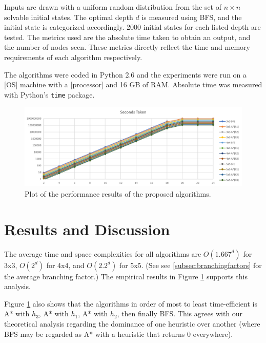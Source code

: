 \documentclass[runningheads]{llncs}
\begin{document}
Inputs are drawn with a uniform random distribution from the set of $n \times n$ solvable initial states. The optimal depth $d$ is measured using BFS, and the initial state is categorized accordingly. 2000 initial states for each listed depth are tested.
The metrics used are the absolute time taken to obtain an output, and the number of nodes seen. These metrics directly reflect the time and memory requirements of each algorithm respectively.

The algorithms were coded in Python 2.6 and the experiments were run on a [OS] machine with a [processor] and 16 GB of RAM. Absolute time was measured with Python's \texttt{time} package.

\begin{figure}[h!]
	\centering
	\includegraphics[width=\textwidth]{results_time.png}
	\caption{Plot of the performance results of the proposed algorithms.} \label{fig:results}
\end{figure}



\section{Results and Discussion}
The average time and space complexities for all algorithms are $O(1.667^d)$ for 3x3, $O(2^d)$ for 4x4, and $O(2.2^d)$ for 5x5. (See see \ref{subsec:branchingfactors} for the average branching factor.) The empirical results in Figure \ref{fig:results} supports this analysis.

Figure \ref{fig:results} also shows that the algorithms in order of most to least time-efficient is A* with $h_3$, A* with $h_1$, A* with $h_2$, then finally BFS. This agrees with our theoretical analysis regarding the dominance of one heuristic over another (where BFS may be regarded as A* with a heuristic that returns 0 everywhere).

\end{document}
